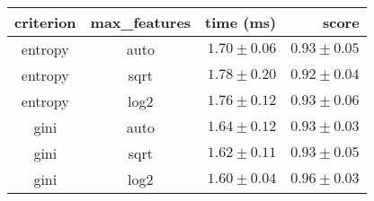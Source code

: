 \begin{tabular}{ccrr}
\toprule
\textbf{criterion} & \textbf{max\_features} & \textbf{time (ms)} & \textbf{score}\\
\midrule
entropy & auto & $1.70 \pm 0.06$ & $0.93 \pm 0.05$\\
entropy & sqrt & $1.78 \pm 0.20$ & $0.92 \pm 0.04$\\
entropy & log2 & $1.76 \pm 0.12$ & $0.93 \pm 0.06$\\
gini & auto & $1.64 \pm 0.12$ & $0.93 \pm 0.03$\\
gini & sqrt & $1.62 \pm 0.11$ & $0.93 \pm 0.05$\\
gini & log2 & $1.60 \pm 0.04$ & $0.96 \pm 0.03$\\
\bottomrule
\end{tabular}
